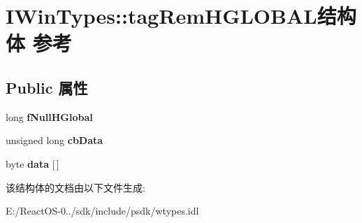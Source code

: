 \hypertarget{struct_i_win_types_1_1tag_rem_h_g_l_o_b_a_l}{}\section{I\+Win\+Types\+:\+:tag\+Rem\+H\+G\+L\+O\+B\+A\+L结构体 参考}
\label{struct_i_win_types_1_1tag_rem_h_g_l_o_b_a_l}
\subsection*{Public 属性}
\begin{DoxyCompactItemize}
\item 
\mbox{\label{struct_i_win_types_1_1tag_rem_h_g_l_o_b_a_l_a70635ea554f7110e0db78ecade06b434}} 
long {\bfseries f\+Null\+H\+Global}
\item 
\mbox{\label{struct_i_win_types_1_1tag_rem_h_g_l_o_b_a_l_a9de996f963e376e2a22fc19084e3710d}} 
unsigned long {\bfseries cb\+Data}
\item 
\mbox{\label{struct_i_win_types_1_1tag_rem_h_g_l_o_b_a_l_a659f44337f09a142b931e39325169447}} 
byte {\bfseries data} \mbox{[}$\,$\mbox{]}
\end{DoxyCompactItemize}


该结构体的文档由以下文件生成\+:\begin{DoxyCompactItemize}
\item 
E\+:/\+React\+O\+S-\/0../sdk/include/psdk/wtypes.\+idl\end{DoxyCompactItemize}
